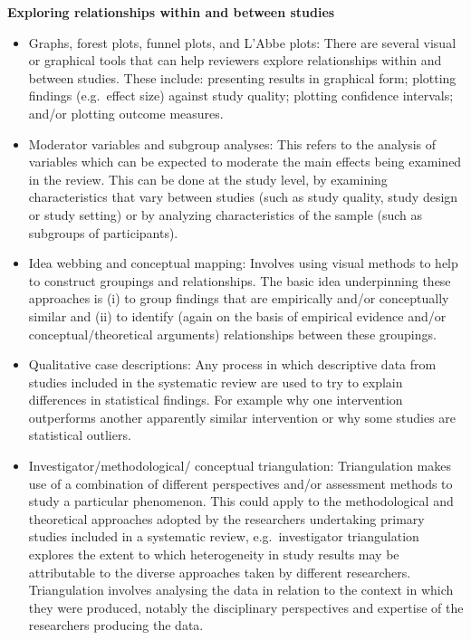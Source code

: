 \documentclass[
  11pt,
  a4paper,
  DIV=11,
  numbers=noendperiod]{scrreprt}
\begin{document}
\textbf{Exploring relationships within and between studies}

\begin{itemize}
\item
  Graphs, forest plots, funnel plots, and L'Abbe plots: There are
  several visual or graphical tools that can help reviewers explore
  relationships within and between studies. These include: presenting
  results in graphical form; plotting findings (e.g.~effect size)
  against study quality; plotting confidence intervals; and/or plotting
  outcome measures.
\item
  Moderator variables and subgroup analyses: This refers to the analysis
  of variables which can be expected to moderate the main effects being
  examined in the review. This can be done at the study level, by
  examining characteristics that vary between studies (such as study
  quality, study design or study setting) or by analyzing
  characteristics of the sample (such as subgroups of participants).
\item
  Idea webbing and conceptual mapping: Involves using visual methods to
  help to construct groupings and relationships. The basic idea
  underpinning these approaches is (i) to group findings that are
  empirically and/or conceptually similar and (ii) to identify (again on
  the basis of empirical evidence and/or conceptual/theoretical
  arguments) relationships between these groupings.
\item
  Qualitative case descriptions: Any process in which descriptive data
  from studies included in the systematic review are used to try to
  explain differences in statistical findings. For example why one
  intervention outperforms another apparently similar intervention or
  why some studies are statistical outliers.
\item
  Investigator/methodological/ conceptual triangulation: Triangulation
  makes use of a combination of different perspectives and/or assessment
  methods to study a particular phenomenon. This could apply to the
  methodological and theoretical approaches adopted by the researchers
  undertaking primary studies included in a systematic review,
  e.g.~investigator triangulation explores the extent to which
  heterogeneity in study results may be attributable to the diverse
  approaches taken by different researchers. Triangulation involves
  analysing the data in relation to the context in which they were
  produced, notably the disciplinary perspectives and expertise of the
  researchers producing the data.
\end{itemize}
\end{document}
